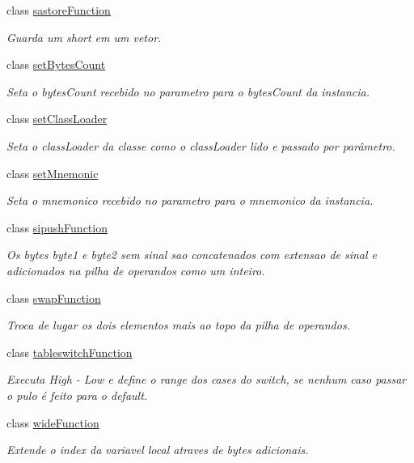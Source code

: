 \begin{DoxyCompactItemize}
class \hyperlink{classInstruction_1_1sastoreFunction}{sastore\+Function}
\begin{DoxyCompactList}\small\item\em Guarda um short em um vetor. \end{DoxyCompactList}\item 
class \hyperlink{classInstruction_1_1setBytesCount}{set\+Bytes\+Count}
\begin{DoxyCompactList}\small\item\em Seta o bytes\+Count recebido no parametro para o bytes\+Count da instancia. \end{DoxyCompactList}\item 
class \hyperlink{classInstruction_1_1setClassLoader}{set\+Class\+Loader}
\begin{DoxyCompactList}\small\item\em Seta o class\+Loader da classe como o class\+Loader lido e passado por parâmetro. \end{DoxyCompactList}\item 
class \hyperlink{classInstruction_1_1setMnemonic}{set\+Mnemonic}
\begin{DoxyCompactList}\small\item\em Seta o mnemonico recebido no parametro para o mnemonico da instancia. \end{DoxyCompactList}\item 
class \hyperlink{classInstruction_1_1sipushFunction}{sipush\+Function}
\begin{DoxyCompactList}\small\item\em Os bytes byte1 e byte2 sem sinal sao concatenados com extensao de sinal e adicionados na pilha de operandos como um inteiro. \end{DoxyCompactList}\item 
class \hyperlink{classInstruction_1_1swapFunction}{swap\+Function}
\begin{DoxyCompactList}\small\item\em Troca de lugar os dois elementos mais ao topo da pilha de operandos. \end{DoxyCompactList}\item 
class \hyperlink{classInstruction_1_1tableswitchFunction}{tableswitch\+Function}
\begin{DoxyCompactList}\small\item\em Executa High -\/ Low e define o range dos cases do switch, se nenhum caso passar o pulo é feito para o default. \end{DoxyCompactList}\item 
class \hyperlink{classInstruction_1_1wideFunction}{wide\+Function}
\begin{DoxyCompactList}\small\item\em Extende o index da variavel local atraves de bytes adicionais. \end{DoxyCompactList}\end{DoxyCompactItemize}

